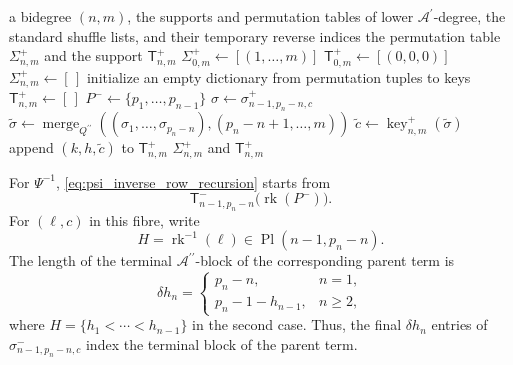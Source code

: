 \documentclass{amsart}
\theoremstyle{definition}
\theoremstyle{remark}
\begin{document}
\begin{algorithm}[ht]
\caption{Sparse support for $\Psi$}
\label{alg:psi_support}
\begin{algorithmic}[1]
\Require a bidegree $(n,m)$, the supports and permutation tables of lower
$\mathcal{A}^{\prime}$-degree, the standard shuffle lists, and their
temporary reverse indices
\Ensure the permutation table $\Sigma^{+}_{n,m}$ and the support
$\mathsf{T}^{+}_{n,m}$
    \State
    $\Sigma^{+}_{0,m}\gets[(1,\ldots,m)]$
    \State
    $\mathsf{T}^{+}_{0,m}\gets[(0,0,0)]$
\Else
    \State $\Sigma^{+}_{n,m}\gets[\,]$
    \State initialize an empty dictionary from permutation tuples to keys
    \State $\mathsf{T}^{+}_{n,m}\gets[\,]$
        \State
        $P^{-}\gets\{p_1,\ldots,p_{n-1}\}$
            \State
            $\sigma\gets\sigma^{+}_{n-1,p_n-n,c}$
                    \State
                    $\widetilde{\sigma}
                    \gets
                    \operatorname{merge}_{Q^{\prime\prime}}
                    \left(
                        (\sigma_1,\ldots,\sigma_{p_n-n}),
                        (p_n-n+1,\ldots,m)
                    \right)$
                    \State
                    $\widetilde{c}
                    \gets
                    \operatorname{key}^{+}_{n,m}
                    (\widetilde{\sigma})$
                    \State append
                    $(k,h,\widetilde{c})$
                    to $\mathsf{T}^{+}_{n,m}$
                \EndFor
            \EndFor
        \EndFor
    \EndFor
\EndIf
\State \Return $\Sigma^{+}_{n,m}$ and $\mathsf{T}^{+}_{n,m}$
\end{algorithmic}
\end{algorithm}

For $\Psi^{-1}$,
\eqref{eq:psi_inverse_row_recursion} starts from
\[
    \mathsf{T}^{-}_{n-1,p_n-n}
    \bigl(
        \operatorname{rk}(P^{-})
    \bigr).
\]
For $(\ell,c)$ in this fibre, write
\[
    H
    =
    \operatorname{rk}^{-1}(\ell)
    \in
    \operatorname{Pl}(n-1,p_n-n).
\]
The length of the terminal
$\mathcal{A}^{\prime\prime}$-block of the corresponding parent term is
\[
    \delta h_n
    =
    \begin{cases}
        p_n-n,
        & n=1,
        \\
        p_n-1-h_{n-1},
        & n\geq2,
    \end{cases}
\]
where $H=\{h_1<\cdots<h_{n-1}\}$ in the second case. Thus, the final
$\delta h_n$ entries of
$\sigma^{-}_{n-1,p_n-n,c}$ index the terminal block of the parent term.
\end{document}
